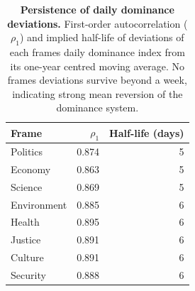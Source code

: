 \begin{table}[H]
\centering
\renewcommand{\arraystretch}{1.15}
\caption{\textbf{Persistence of daily dominance deviations.}
First-order autocorrelation ($\rho_1$) and implied half-life of
deviations of each frame\textquotesingle s daily dominance index from its
one-year centred moving average. No frame\textquotesingle s deviations survive
beyond a week, indicating strong mean reversion of the dominance system.}
\label{tab:si_persistence}
\vspace{0.3em}
\small
\begin{tabular}{@{}l r r@{}}
\toprule
Frame & $\rho_1$ & Half-life (days) \\
\midrule
Politics & 0.874 & 5 \\
Economy & 0.863 & 5 \\
Science & 0.869 & 5 \\
Environment & 0.885 & 6 \\
Health & 0.895 & 6 \\
Justice & 0.891 & 6 \\
Culture & 0.891 & 6 \\
Security & 0.888 & 6 \\
\bottomrule
\end{tabular}
\end{table}
